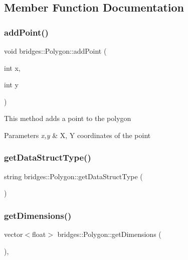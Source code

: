 \subsection{Member Function Documentation}
\mbox{\label{classbridges_1_1_polygon_ad38f9d5431e4a2dc9f5ed633e118c95c}} 
\subsubsection{\texorpdfstring{addPoint()}{addPoint()}}
{\footnotesize\ttfamily void bridges\+::\+Polygon\+::add\+Point (\begin{DoxyParamCaption}\item[{int}]{x,  }\item[{int}]{y }\end{DoxyParamCaption})\hspace{0.3cm}{\ttfamily [inline]}}

This method adds a point to the polygon


\begin{DoxyParams}{Parameters}
{\em x,y} & X, Y coordinates of the point \\
\hline
\end{DoxyParams}
\mbox{\label{classbridges_1_1_polygon_a6b6d16de65c74f1e2e4e8f0ff4056451}} 
\subsubsection{\texorpdfstring{getDataStructType()}{getDataStructType()}}
{\footnotesize\ttfamily string bridges\+::\+Polygon\+::get\+Data\+Struct\+Type (\begin{DoxyParamCaption}{ }\end{DoxyParamCaption})\hspace{0.3cm}{\ttfamily [inline]}}

\mbox{\label{classbridges_1_1_polygon_a6ad07473cb57633eca62a3f6832ea08c}} 
\subsubsection{\texorpdfstring{getDimensions()}{getDimensions()}}
{\footnotesize\ttfamily vector$<$float$>$ bridges\+::\+Polygon\+::get\+Dimensions (\begin{DoxyParamCaption}{ }\end{DoxyParamCaption})\hspace{0.3cm}{\ttfamily [inline]}, {\ttfamily [virtual]}}

